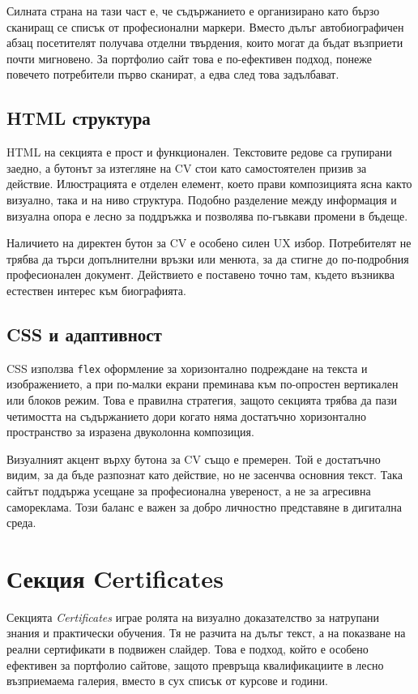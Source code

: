 \documentclass[11pt,a4paper]{article}
\begin{document}
Силната страна на тази част е, че съдържанието е организирано като бързо сканиращ се списък от професионални маркери. Вместо дълъг автобиографичен абзац посетителят получава отделни твърдения, които могат да бъдат възприети почти мигновено. За портфолио сайт това е по-ефективен подход, понеже повечето потребители първо сканират, а едва след това задълбават.

\subsection{HTML структура}
HTML на секцията е прост и функционален. Текстовите редове са групирани заедно, а бутонът за изтегляне на CV стои като самостоятелен призив за действие. Илюстрацията е отделен елемент, което прави композицията ясна както визуално, така и на ниво структура. Подобно разделение между информация и визуална опора е лесно за поддръжка и позволява по-гъвкави промени в бъдеще.

Наличието на директен бутон за CV е особено силен UX избор. Потребителят не трябва да търси допълнителни връзки или менюта, за да стигне до по-подробния професионален документ. Действието е поставено точно там, където възниква естествен интерес към биографията.

\subsection{CSS и адаптивност}
CSS използва \texttt{flex} оформление за хоризонтално подреждане на текста и изображението, а при по-малки екрани преминава към по-опростен вертикален или блоков режим. Това е правилна стратегия, защото секцията трябва да пази четимостта на съдържанието дори когато няма достатъчно хоризонтално пространство за изразена двуколонна композиция.

Визуалният акцент върху бутона за CV също е премерен. Той е достатъчно видим, за да бъде разпознат като действие, но не засенчва основния текст. Така сайтът поддържа усещане за професионална увереност, а не за агресивна самореклама. Този баланс е важен за добро личностно представяне в дигитална среда.

\section{Секция Certificates}
Секцията \textit{Certificates} играе ролята на визуално доказателство за натрупани знания и практически обучения. Тя не разчита на дълъг текст, а на показване на реални сертификати в подвижен слайдер. Това е подход, който е особено ефективен за портфолио сайтове, защото превръща квалификациите в лесно възприемаема галерия, вместо в сух списък от курсове и години.
\end{document}
